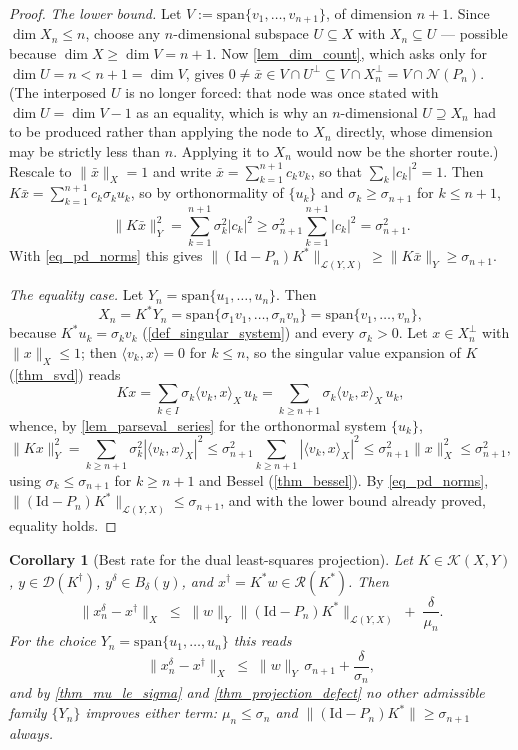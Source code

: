 \documentclass[a4paper]{report}
\theoremstyle{plain}
\newtheorem{corollary}[theorem]{Corollary}
\theoremstyle{definition}
\theoremstyle{remark}
\newcommand{\Ll}{\mathcal{L}}
\newcommand{\Kk}{\mathcal{K}}
\newcommand{\Ran}{\mathcal{R}}
\newcommand{\Ker}{\mathcal{N}}
\newcommand{\Dom}{\mathcal{D}}
\newcommand{\Id}{\mathrm{Id}}
\newcommand{\dg}{^{\dagger}}
\begin{document}
\begin{proof}
  \emph{The lower bound.}  Let $V := \mathrm{span}\{v_1,\dots,v_{n+1}\}$, of dimension
  $n+1$.  Since $\dim X_n \le n$, choose any $n$-dimensional subspace $U \subseteq X$ with
  $X_n \subseteq U$ --- possible because $\dim X \ge \dim V = n+1$.  Now
  \cref{lem_dim_count}, which asks only for $\dim U = n < n+1 = \dim V$, gives
  $0 \ne \bar{x} \in V \cap U^{\perp} \subseteq V \cap X_n^{\perp} = V \cap \Ker(P_n)$.
  (The interposed $U$ is no longer forced: that node was once stated with
  $\dim U = \dim V - 1$ as an equality, which is why an $n$-dimensional $U \supseteq X_n$
  had to be produced rather than applying the node to $X_n$ directly, whose dimension may
  be strictly less than $n$.  Applying it to $X_n$ would now be the shorter route.)
  Rescale to $\|\bar{x}\|_X = 1$ and write
  $\bar{x} = \sum_{k=1}^{n+1}c_kv_k$, so that $\sum_k|c_k|^{2} = 1$.  Then
  $K\bar{x} = \sum_{k=1}^{n+1}c_k\sigma_ku_k$, so by orthonormality of $\{u_k\}$ and
  $\sigma_k \ge \sigma_{n+1}$ for $k \le n+1$,
  \[
    \|K\bar{x}\|_Y^{2} = \sum_{k=1}^{n+1}\sigma_k^{2}|c_k|^{2}
      \ge \sigma_{n+1}^{2}\sum_{k=1}^{n+1}|c_k|^{2} = \sigma_{n+1}^{2} .
  \]
  With \eqref{eq_pd_norms} this gives
  $\|(\Id - P_n)K^{*}\|_{\Ll(Y,X)} \ge \|K\bar{x}\|_Y \ge \sigma_{n+1}$.

  \emph{The equality case.}  Let $Y_n = \mathrm{span}\{u_1,\dots,u_n\}$.  Then
  \[
    X_n = K^{*}Y_n = \mathrm{span}\{\sigma_1v_1,\dots,\sigma_nv_n\}
      = \mathrm{span}\{v_1,\dots,v_n\} ,
  \]
  because $K^{*}u_k = \sigma_kv_k$ (\cref{def_singular_system}) and every $\sigma_k > 0$.
  Let $x \in X_n^{\perp}$ with $\|x\|_X \le 1$; then $\langle v_k,x\rangle = 0$ for
  $k \le n$, so the singular value expansion of $K$ (\cref{thm_svd}) reads
  \[
    Kx = \sum_{k \in I}\sigma_k\langle v_k,x\rangle_X\,u_k
      = \sum_{k \ge n+1}\sigma_k\langle v_k,x\rangle_X\,u_k ,
  \]
  whence, by \cref{lem_parseval_series} for the orthonormal system $\{u_k\}$,
  \[
    \|Kx\|_Y^{2} = \sum_{k \ge n+1}\sigma_k^{2}|\langle v_k,x\rangle_X|^{2}
      \le \sigma_{n+1}^{2}\sum_{k \ge n+1}|\langle v_k,x\rangle_X|^{2}
      \le \sigma_{n+1}^{2}\|x\|_X^{2} \le \sigma_{n+1}^{2} ,
  \]
  using $\sigma_k \le \sigma_{n+1}$ for $k \ge n+1$ and Bessel (\cref{thm_bessel}).  By
  \eqref{eq_pd_norms}, $\|(\Id-P_n)K^{*}\|_{\Ll(Y,X)} \le \sigma_{n+1}$, and with the
  lower bound already proved, equality holds.
\end{proof}


\begin{corollary}[Best rate for the dual least-squares projection]
  \label{cor_dual_lsq_best_rate}
  Let $K \in \Kk(X,Y)$, $y \in \Dom(K\dg)$, $y^{\delta} \in B_{\delta}(y)$, and
  $x\dg = K^{*}w \in \Ran(K^{*})$.  Then
  \[
    \|x^{\delta}_n - x\dg\|_X \;\le\;
      \|w\|_Y\,\bigl\|(\Id - P_n)K^{*}\bigr\|_{\Ll(Y,X)} \;+\; \frac{\delta}{\mu_n} .
  \]
  For the choice $Y_n = \mathrm{span}\{u_1,\dots,u_n\}$ this reads
  \[
    \|x^{\delta}_n - x\dg\|_X \;\le\; \|w\|_Y\,\sigma_{n+1} + \frac{\delta}{\sigma_n} ,
  \]
  and by \cref{thm_mu_le_sigma} and \cref{thm_projection_defect} no other admissible
  family $\{Y_n\}$ improves either term: $\mu_n \le \sigma_n$ and
  $\|(\Id-P_n)K^{*}\| \ge \sigma_{n+1}$ always.
\end{corollary}
\end{document}
